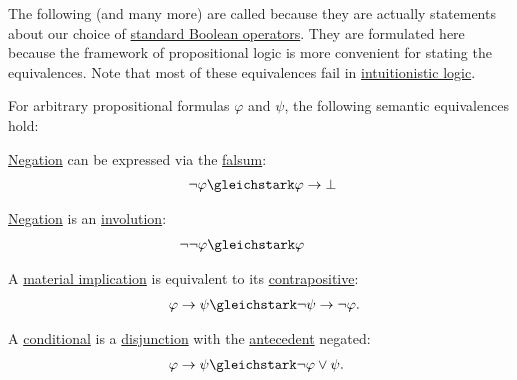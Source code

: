 \begin{proposition}\label{thm:boolean_equivalences}
  The following (and many more) are called  because they are actually statements about our choice of \hyperref[def:standard_boolean_operators]{standard Boolean operators}. They are formulated here because the framework of propositional logic is more convenient for stating the equivalences. Note that most of these equivalences fail in \hyperref[def:intuitionistic_propositional_deductive_systems]{intuitionistic logic}.

  For arbitrary propositional formulas \( \varphi \) and \( \psi \), the following semantic equivalences hold:
  \begin{thmenum}
     \hyperref[def:propositional_language/negation]{Negation} can be expressed via the \hyperref[def:propositional_language/constants/falsum]{falsum}:
    \begin{equation}\label{eq:thm:boolean_equivalences/negation_bottom}
      \begin{split}
        \mathllap{\neg \varphi} &\gleichstark \mathrlap{\varphi \rightarrow \bot}.
      \end{split}
    \end{equation}

     \hyperref[def:propositional_language/negation]{Negation} is an \hyperref[def:set_with_involution]{involution}:
    \begin{equation}\label{eq:thm:boolean_equivalences/double_negation}
      \begin{split}
        \mathllap{\neg \neg \varphi} &\gleichstark \mathrlap{\varphi}.
      \end{split}
    \end{equation}

     A \hyperref[def:material_implication]{material implication} is equivalent to its \hyperref[def:material_implication/contrapositive]{contrapositive}:
    \begin{equation}\label{eq:thm:boolean_equivalences/contrapositive}
      \begin{split}
        \mathllap{\varphi \rightarrow \psi} &\gleichstark \mathrlap{\neg \psi \rightarrow \neg \varphi.}
      \end{split}
    \end{equation}

     A \hyperref[def:propositional_language/connectives/conditional]{conditional} is a \hyperref[def:propositional_language/connectives/disjunction]{disjunction} with the \hyperref[def:material_implication/antecedent]{antecedent} negated:
    \begin{equation}\label{eq:thm:boolean_equivalences/conditional_as_disjunction}
      \begin{split}
        \mathllap{\varphi \rightarrow \psi} &\gleichstark \mathrlap{ \neg \varphi \vee \psi. }
      \end{split}
    \end{equation}


\end{thmenum}
\end{proposition}
